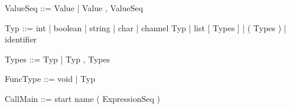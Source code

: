 \documentclass[11pt]{report}
\begin{document}
\begin{verbnobox}[\normalfont]
ValueSeq ::= Value | Value , ValueSeq
\end{verbnobox}
\vspace*{3pt}

\begin{verbnobox}[\normalfont]
Typ ::= int
      | boolean
      | string
      | char
      | channel Typ
      | list [ Types ]
      | ( Types )
      | identifier
\end{verbnobox}
\vspace*{3pt}

\begin{verbnobox}[\normalfont]
Types ::= Typ | Typ , Types
\end{verbnobox}
\vspace*{3pt}

\begin{verbnobox}[\normalfont]
FuncType ::= void | Typ
\end{verbnobox}
\vspace*{3pt}

\begin{verbnobox}[\normalfont]
CallMain ::= start name ( ExpressionSeq )
\end{verbnobox}
\vspace*{3pt}
\end{document}
